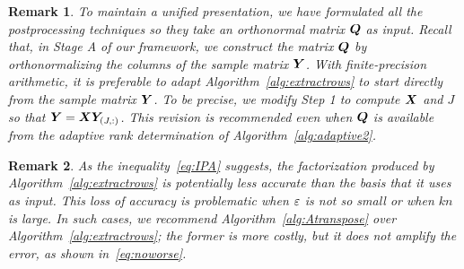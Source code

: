 \documentclass[final]{siamltex}
\newtheorem{remark}{Remark}[section]
\begin{document}
\lsp

\begin{remark}\rm
\label{remark:use_Y_in rowextraction}
To maintain a unified presentation, we have formulated all the
postprocessing techniques so they take an orthonormal matrix
$\bm{Q}$ as input.  Recall that, in Stage A of our framework,
we construct the matrix $\bm{Q}$ by orthonormalizing the columns
of the sample matrix $\bm{Y}$.  With finite-precision
arithmetic, it is preferable to adapt Algorithm~\ref{alg:extractrows}
to start directly from the sample matrix $\bm{Y}$.
To be precise, we modify Step 1 to compute $\bm{X}$ and $J$
so that $\bm{Y} = \bm{XY}_{(J,:)}$.  This revision is
recommended even when $\bm{Q}$ is available from the
adaptive rank determination of Algorithm~\ref{alg:adaptive2}.
%
\end{remark}

\lsp

\begin{remark}\rm
\label{remark:errors}
As the inequality~\eqref{eq:IPA} suggests, the factorization
produced by Algorithm~\ref{alg:extractrows} is potentially
less accurate than the basis that it uses as input.  This
loss of accuracy is problematic when $\varepsilon$ is not so small
or when $kn$ is large.
In such cases, we recommend Algorithm~\ref{alg:Atranspose}
over Algorithm~\ref{alg:extractrows}; the former is more costly, but
it does not amplify  the error, as shown in~\eqref{eq:noworse}.
\end{remark}

\end{document}
